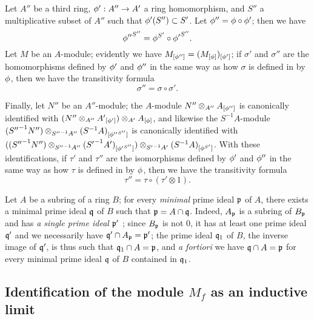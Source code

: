 \begin{env}[1.5.7]
\label{0.1.5.7}
Let $A''$ be a third ring, $\vphi':A''\to A'$ a ring homomorphism, and $S''$ a multiplicative subset of $A''$ such that $\phi'(S'')\subset S'$.
Let $\phi''=\phi\circ\phi'$; then we have
\[
  {\phi''}^{S''}=\phi^{S'}\circ{\phi'}^{S''}.
\]
Let $M$ be an $A$-module; evidently we have $M_{[\phi'']}=(M_{[\phi]})_{[\phi']}$; if $\sigma'$ and $\sigma''$ are the homomorphisms defined by $\phi'$ and $\phi''$ in the same way as how $\sigma$ is defined in  by $\phi$, then we have the transitivity formula
\[
  \sigma''=\sigma\circ\sigma'.
\]

Finally, let $N''$ be an $A''$-module; the $A$-module $N''\otimes_{A''}A_{[\phi'']}$ is canonically identified with $(N''\otimes_{A''}{A'}_{[\phi']})\otimes_{A'}A_{[\phi]}$, and likewise the $S^{-1}A$-module $({S''}^{-1}N'')\otimes_{{S''}^{-1}A''}(S^{-1}A)_{[{\phi''}^{S''}]}$ is canonically identified with $(({S''}^{-1}N'')\otimes_{{S''}^{-1}A''}({S'}^{-1}A')_{[{\phi'}^{S''}]})
  \otimes_{{S'}^{-1}A'}(S^{-1}A)_{[\phi^{S'}]}$.
With these identifications, if $\tau'$ and $\tau''$ are the isomorphisms defined by $\phi'$ and $\phi''$ in the same way as how $\tau$ is defined in  by $\phi$, then we have the transitivity formula
\[
  \tau''=\tau\circ(\tau'\otimes 1).
\]
\end{env}

\begin{env}[1.5.8]
\label{0.1.5.8}
Let $A$ be a subring of a ring $B$; for every \emph{minimal} prime ideal $\mathfrak{p}$ of $A$, there exists a minimal prime ideal $\mathfrak{q}$ of $B$ such that $\mathfrak{p}=A\cap\mathfrak{q}$.
Indeed, $A_\mathfrak{p}$ is a subring of $B_\mathfrak{p}$  and has \emph{a single prime ideal $\mathfrak{p}'$} ; since $B_\mathfrak{p}$ is not $0$, it has at least one prime ideal $\mathfrak{q}'$ and we necessarily have $\mathfrak{q}'\cap A_\mathfrak{p}=\mathfrak{p}'$; the prime ideal $\mathfrak{q}_1$ of $B$, the inverse image of $\mathfrak{q}'$, is thus such that $\mathfrak{q}_1\cap A=\mathfrak{p}$, and \emph{a fortiori} we have $\mathfrak{q}\cap A=\mathfrak{p}$ for every minimal prime ideal $\mathfrak{q}$ of $B$ contained in $\mathfrak{q}_1$.
\end{env}

\subsection{Identification of the module $M_f$ as an inductive limit}
\label{subsection:localization-as-inductive-limit}

